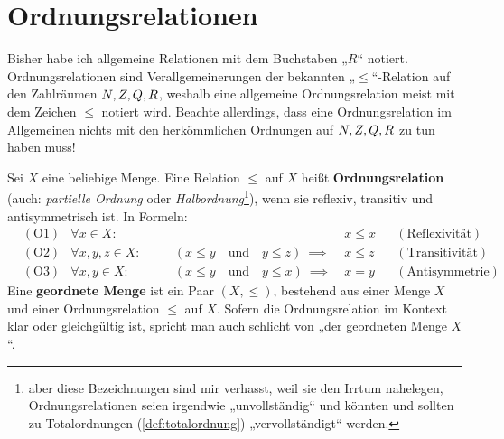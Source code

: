\section{Ordnungsrelationen} \label{sec:ordnungsrelationen}


\begin{nota}
    Bisher habe ich allgemeine Relationen mit dem Buchstaben „$R$“ notiert. Ordnungsrelationen sind Verallgemeinerungen der bekannten „$\le$“-Relation auf den Zahlräumen $\relax N,\relax Z,\relax Q,\relax R$, weshalb eine allgemeine Ordnungsrelation meist mit dem Zeichen $\le$ notiert wird. Beachte allerdings, dass eine Ordnungsrelation im Allgemeinen nichts mit den herkömmlichen Ordnungen auf $\relax N,\relax Z,\relax Q,\relax R$ zu tun haben muss!
\end{nota}


\begin{defin}[Ordnungsrelation] \label{def:ordnungsrelation}    
    Sei $X$ eine beliebige Menge. Eine Relation $\le$ auf $X$ heißt \textbf{Ordnungsrelation} (auch: \emph{partielle Ordnung} oder \emph{Halbordnung}\footnote{aber diese Bezeichnungen sind mir verhasst, weil sie den Irrtum nahelegen, Ordnungsrelationen seien irgendwie „unvollständig“ und könnten und sollten zu Totalordnungen (\cref{def:totalordnung}) „vervollständigt“ werden.}), wenn sie reflexiv, transitiv und antisymmetrisch ist. In Formeln:
    \begin{align*}
        & (\text{O1}) & \forall x\in X:&&\quad &x\le x && (\text{Reflexivität}) \\
        & (\text{O2}) & \forall x,y,z\in X:&&\quad (x\le y\quad \text{und}\quad y\le z)\ \implies\ & x\le z && (\text{Transitivität}) \\
        & (\text{O3}) & \forall x,y\in X:&&\quad  (x\le y\quad \text{und}\quad y\le x)\ \implies\ & x=y && (\text{Antisymmetrie})
    \end{align*}
    Eine \textbf{geordnete Menge} ist ein Paar $(X,\le)$, bestehend aus einer Menge $X$ und einer Ordnungsrelation $\le$ auf $X$. Sofern die Ordnungsrelation im Kontext klar oder gleichgültig ist, spricht man auch schlicht von „der geordneten Menge $X$“.
\end{defin}


